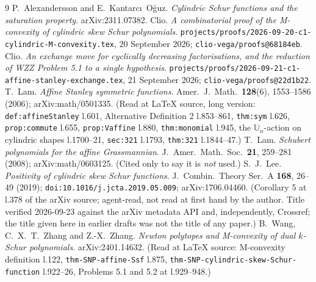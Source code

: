 \documentclass[11pt]{article}
\theoremstyle{plain}
\theoremstyle{definition}
\begin{document}
\begin{thebibliography}{9}
 P.~Alexandersson and E.~Kantarc\i\ O\u{g}uz. \emph{Cylindric Schur functions and
  the saturation property}. arXiv:2311.07382.
 Clio. \emph{A combinatorial proof of the M-convexity of cylindric skew Schur
  polynomials}. \texttt{projects/proofs/2026-09-20-c1-cylindric-M-convexity.tex},
  20 September 2026; \texttt{clio-vega/proofs@68184eb}.
 Clio. \emph{An exchange move for cyclically decreasing factorisations, and
  the reduction of WZZ Problem 5.1 to a single hypothesis}.
  \texttt{projects/proofs/2026-09-21-c1-affine-stanley-exchange.tex}, 21 September 2026;
  \texttt{clio-vega/proofs@22d1b22}.
 T.~Lam. \emph{Affine Stanley symmetric functions}. Amer.\ J.\ Math.\
  \textbf{128}(6), 1553--1586 (2006); arXiv:math/0501335. (Read at LaTeX source, long version:
  \texttt{def:affineStanley} l.601, Alternative Definition 2 l.853--861, \texttt{thm:sym}
  l.626, \texttt{prop:commute} l.655, \texttt{prop:Vaffine} l.880, \texttt{thm:monomial} l.945,
  the $\mathbb U_n$-action on cylindric shapes l.1700--21, \texttt{sec:321} l.1793,
  \texttt{thm:321} l.1844--47.)
 T.~Lam. \emph{Schubert polynomials for the affine Grassmannian}. J.~Amer.\
  Math.\ Soc.\ \textbf{21}, 259--281 (2008); arXiv:math/0603125. (Cited only to say it is
  \emph{not} used.)
\bibitem{Lee2019} S.~J.~Lee. \emph{Positivity of cylindric skew Schur functions}. J.~Combin.\
  Theory Ser.~A \textbf{168}, 26--49 (2019); \texttt{doi:10.1016/j.jcta.2019.05.009};
  arXiv:1706.04460. (Corollary 5 at l.378 of the arXiv source; agent-read, not read at first hand
  by the author. Title verified 2026-09-23 against the arXiv metadata API and, independently,
  Crossref; the title given here in earlier drafts was not the title of any paper.)
\bibitem{WZZ} B.~Wang, C.~X.~T.~Zhang and Z.-X.~Zhang. \emph{Newton polytopes and M-convexity of
  dual $k$-Schur polynomials}. arXiv:2401.14632. (Read at LaTeX source: M-convexity definition
  l.122, \texttt{thm-SNP-affine-Ssf} l.875, \texttt{thm-SNP-cylindric-skew-Schur-function}
  l.922--26, Problems 5.1 and 5.2 at l.929--948.)
\end{thebibliography}
\end{document}
